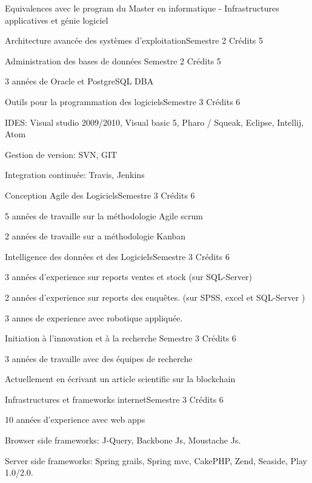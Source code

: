 \documentclass{resume} %
\begin{document}
\begin{rSection}{Equivalences avec le program du Master en informatique - Infrastructures applicatives et génie logiciel}
\begin{rSubsection}{ Architecture avancée des systèmes d'exploitation}{Semestre 2}{ Crédits 5 }
	\end{rSubsection}
	\begin{rSubsection}{ Administration des bases de données }{Semestre 2}{ Crédits 5 }
		\item 3 années de Oracle et PostgreSQL DBA
	\end{rSubsection}

	\begin{rSubsection}{Outils pour la programmation des logiciels}{Semestre 3}{ Crédits 6 }
		\item IDES: Visual studio 2009/2010, Visual basic 5, Pharo / Squeak,  Eclipse, Intellij, Atom
		\item Gestion de version: SVN, GIT
		\item Integration continuée: Travis, Jenkins
	\end{rSubsection}
	\begin{rSubsection}{Conception Agile des Logiciels}{Semestre 3}{ Crédits 6 }
		\item 5 années de travaille sur la méthodologie  Agile scrum
		\item 2 années de travaille sur a  méthodologie Kanban
	\end{rSubsection}
	\begin{rSubsection}{Intelligence des données et des Logiciels}{Semestre 3}{ Crédits 6 }
		\item 3 années d'experience sur reports ventes et stock (sur SQL-Server) 
		\item 2 années d'experience sur reports des enquêtes. (sur SPSS, excel et SQL-Server )  
		\item 3 annes de experience avec robotique appliquée. 
		\item 
	\end{rSubsection}
	\begin{rSubsection}{Initiation à l'innovation et à la recherche }{Semestre 3}{ Crédits 6 }
		\item 3 années de travaille avec des équipes de recherche
		\item Actuellement en écrivant un article scientific sur la blockchain 
	\end{rSubsection}
	\begin{rSubsection}{Infrastructures et frameworks internet}{Semestre 3}{ Crédits 6 }
		\item 10 années d’experience avec web apps
		\item Browser side frameworks: J-Query, Backbone Js, Moustache Js. 
		\item Server side frameworks: Spring grails, Spring mvc, CakePHP, Zend, Seaside, Play 1.0/2.0. 
	\end{rSubsection}
	

\end{rSection}
\end{document}
